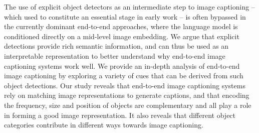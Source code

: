 The use of explicit object detectors as an intermediate step to image captioning -- which used to constitute an essential stage in early work -- is often bypassed in the currently dominant end-to-end approaches, where the language model is conditioned directly on a mid-level image embedding. We argue that explicit detections provide rich semantic information, and can thus be used as an interpretable representation to better understand why end-to-end image captioning systems work well. We provide an in-depth analysis of end-to-end image captioning by exploring a variety of cues that can be derived from such object detections. Our study reveals that end-to-end image captioning systems rely on matching image representations to generate captions, and that encoding the frequency, size and position of objects are complementary and all play a role in forming a good image representation. It also reveals that different object categories contribute in different ways towards image captioning.
